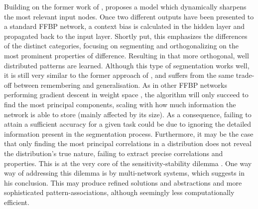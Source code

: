 Building on the former work of \cite{French1992}, \cite{French1994} proposes a model which dynamically sharpens the most relevant input nodes. Once two different outputs have been presented to a standard FFBP network, a context bias is calculated in the hidden layer and propagated back to the input layer. Shortly put, this emphasizes the differences of the distinct categories, focusing on segmenting and orthogonalizing on the most prominent properties of difference. Resulting in that more orthogonal, well distributed patterns are learned.
Although this type of segmentation works well, it is still very similar to the former approach of \cite{French1992}, and suffers from the same trade-off between remembering and generalisation. As in other FFBP networks performing gradient descent in weight space \citep{Hinton1989}, the algorithm will only succeed to find the most principal components, scaling with how much information the network is able to store (mainly affected by its size). As a consequence, failing to attain a sufficient accuracy for a given task could be due to ignoring the detailed information present in the segmentation process. Furthermore, it may be the case that only finding the most principal correlations in a distribution does not reveal the distribution's true nature, failing to extract precise correlations and properties. This is at the very core of the sensitivity-stability dilemma \citep{Hebb1949}. One way way of addressing this dilemma is by multi-network systems, which \cite{French1994} suggests in his conclusion. This may produce refined solutions and abstractions and more sophisticated pattern-associations, although seemingly less computationally efficient.


\cleardoublepage